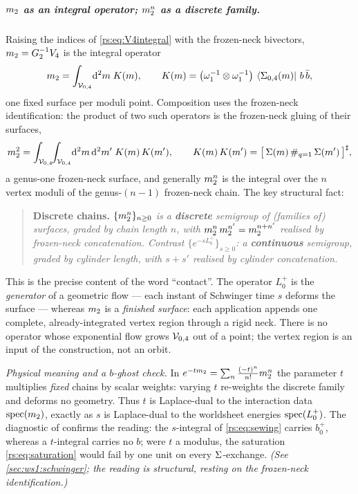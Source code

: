 \subparagraph{$m_2$ as an integral operator; $m_2^n$ as a discrete family.}
Raising the indices of \eqref{rs:eq:V4integral} with the frozen-neck bivectors,
$m_2=G_2^{-1}V_4$ is the integral operator
\begin{equation}
	m_2 = \int_{{\mathcal{V}}_{0,4}}\!\mathrm{d}^2 m\; K(m),
	\qquad
	K(m) = \big(\omega_1^{-1}\otimes\omega_1^{-1}\big)\,
	\mathinner{{}_{}\hspace{-2pt}\left \langle \Sigma_{0,4}(m) \right |}\,b\,\bar b,
	\label{rs:eq:m2integral}
\end{equation}
one fixed surface per moduli point. Composition uses the frozen-neck identification: the product of two
such operators is the frozen-neck gluing of their surfaces,
\begin{equation}
	m_2^2
	= \int_{{\mathcal{V}}_{0,4}}\!\!\int_{{\mathcal{V}}_{0,4}}\!\mathrm{d}^2 m\,\mathrm{d}^2 m'\;
	K(m)\,K(m'),
	\qquad
	K(m)\,K(m') = \big[\,\Sigma(m)\,\#_{q=1}\,\Sigma(m')\,\big]^{\sharp},
	\label{rs:eq:m2squared}
\end{equation}
a genus-one frozen-neck surface, and generally $m_2^n$ is the integral over the
$n$ vertex moduli of the genus-$(n-1)$ frozen-neck chain. The key structural fact:
\begin{quote}
	\textbf{Discrete chains.} \emph{$\{m_2^n\}_{n\ge0}$ is a \textbf{discrete} semigroup of
	(families of) surfaces, graded by chain length $n$, with
	$m_2^n\,m_2^{n'}=m_2^{n+n'}$ realised by frozen-neck concatenation.
	Contrast $\{e^{-sL_0^+}\}_{s\ge0}$: a \textbf{continuous} semigroup, graded by
	cylinder length, with $s+s'$ realised by cylinder concatenation.}
\end{quote}
This is the precise content of the word ``contact''. The operator $L_0^+$ is the
\emph{generator} of a geometric flow --- each instant of Schwinger time $s$
deforms the surface --- whereas $m_2$ is a \emph{finished surface}: each
application appends one complete, already-integrated vertex region through a rigid
neck. There is no operator whose exponential flow grows ${\mathcal{V}}_{0,4}$ out of a
point; the vertex region is an input of the construction, not an orbit.

\medskip
\noindent\emph{Physical meaning and a $b$-ghost check.} In
$e^{-tm_2}=\sum_n\frac{(-t)^n}{n!}m_2^n$ the parameter $t$ multiplies
\emph{fixed} chains by scalar weights: varying $t$ re-weights the discrete family
and deforms no geometry. Thus $t$ is Laplace-dual to the interaction data
$\operatorname{spec}(m_2)$, exactly as $s$ is Laplace-dual to the worldsheet energies
$\operatorname{spec}(L_0^+)$. The diagnostic of  confirms the reading: the
$s$-integral of \eqref{rs:eq:sewing} carries $b_0^+$, whereas a $t$-integral carries
no $b$; were $t$ a modulus, the saturation \eqref{rs:eq:saturation} would fail by one
unit on every $\Sigma$-exchange. \emph{(See \cref{sec:ws1:schwinger}; the reading is structural,
resting on the frozen-neck identification.)}


